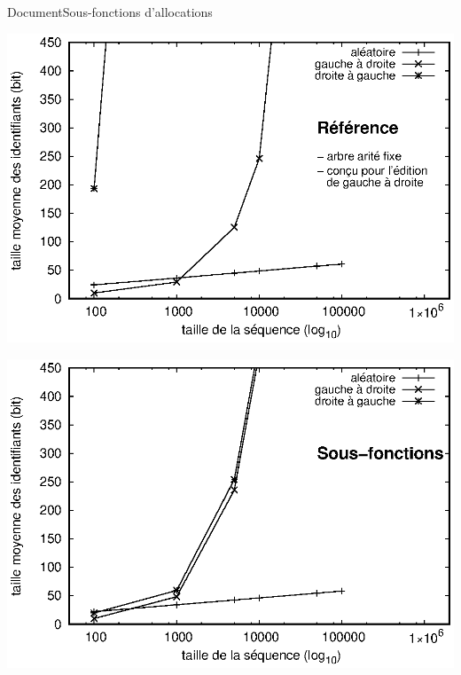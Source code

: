 \begin{frame}{Document}{Sous-fonctions d'allocations}
  \vspace{0.43cm}\hspace{-1cm}
  \begin{minipage}{0.45\textwidth}
    \includegraphics[width=1.25\textwidth]{img/replication/logoot.eps}
  \end{minipage}
  \hspace{1.5cm}
  \begin{minipage}{0.45\textwidth}
    \includegraphics[width=1.25\textwidth]{img/replication/robin.eps}
  \end{minipage}


  

\end{frame}


